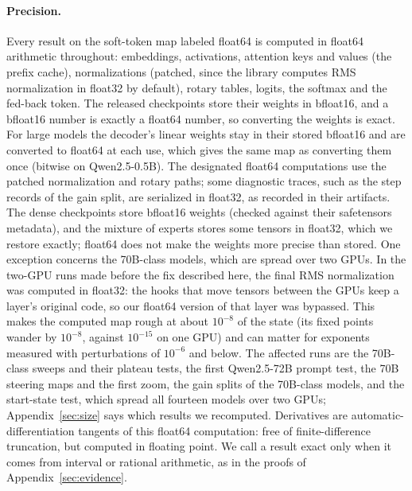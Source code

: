 \documentclass[11pt,letterpaper]{article}
\begin{document}
\paragraph{Precision.} Every result on the soft-token map labeled float64 is computed in float64 arithmetic
throughout: embeddings, activations, attention keys and values (the prefix cache), normalizations (patched, since the
library computes RMS normalization in float32 by default), rotary tables, logits, the softmax and the fed-back token.
The released checkpoints store their weights in bfloat16, and a bfloat16 number is exactly a float64 number, so
converting the weights is exact. For large models the decoder's linear weights stay in their stored bfloat16 and are
converted to float64 at each use, which gives the same map as converting them once (bitwise on Qwen2.5-0.5B). The
designated float64 computations use the patched normalization and rotary paths; some diagnostic traces, such as the
step records of the gain split, are serialized in float32, as recorded in their artifacts. The dense checkpoints store bfloat16 weights (checked against their safetensors
metadata), and the mixture of experts stores some tensors in float32, which we restore exactly; float64 does not make
the weights more precise than stored. One exception concerns the 70B-class models, which are spread over two GPUs. In
the two-GPU runs made before the fix described here, the final RMS normalization was computed in float32: the hooks
that move tensors between the GPUs keep a layer's original code, so our float64 version of that layer was bypassed.
This makes the computed map rough at about $10^{-8}$ of the state (its fixed points wander by $10^{-8}$, against
$10^{-15}$ on one GPU) and can matter for exponents measured with perturbations of $10^{-6}$ and below. The affected
runs are the 70B-class sweeps and their plateau tests, the first Qwen2.5-72B prompt test, the 70B steering maps and
the first zoom, the gain splits of the 70B-class models, and the start-state test, which spread all fourteen models
over two GPUs; Appendix~\ref{sec:size} says which results we recomputed. Derivatives are automatic-differentiation tangents of
this float64 computation: free of finite-difference truncation, but computed in floating point. We call a result
exact only when it comes from interval or rational arithmetic, as in the proofs of Appendix~\ref{sec:evidence}.
\end{document}
